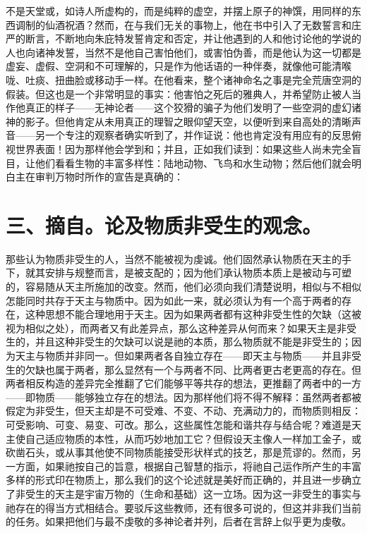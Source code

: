 不是天堂或，如诗人所虚构的，而是纯粹的虚空，并摆上原子的神馔，用同样的东西调制的仙酒祝酒？然而，在与我们无关的事物上，他在书中引入了无数誓言和庄严的断言，不断地向朱庇特发誓肯定和否定，并让他遇到的人和他讨论他的学说的人也向诸神发誓，当然不是他自己害怕他们，或害怕伪善，而是他认为这一切都是虚妄、虚假、空洞和不可理解的，只是作为他话语的一种伴奏，就像他可能清喉咙、吐痰、扭曲脸或移动手一样。在他看来，整个诸神命名之事是完全荒唐空洞的假装。但这也是一个非常明显的事实：他害怕之死后的雅典人，并希望防止被人当作他真正的样子——无神论者——这个狡猾的骗子为他们发明了一些空洞的虚幻诸神的影子。但他肯定从未用真正的理智之眼仰望天空，以便听到来自高处的清晰声音——另一个专注的观察者确实听到了，并作证说：他也肯定没有用应有的反思俯视世界表面！因为那样他会学到和；并且，正如我们读到：如果这些人尚未完全盲目，让他们看看生物的丰富多样性：陆地动物、飞鸟和水生动物；然后他们就会明白主在审判万物时所作的宣告是真确的：\par


\section{三、摘自。论及物质非受生的观念。}

那些认为物质非受生的人，当然不能被视为虔诚。他们固然承认物质在天主的手下，就其安排与规整而言，是被支配的；因为他们承认物质本质上是被动与可塑的，容易随从天主所施加的改变。然而，他们必须向我们清楚说明，相似与不相似怎能同时共存于天主与物质中。因为如此一来，就必须认为有一个高于两者的存在，这种思想不能合理地用于天主。因为如果两者都有这种非受生性的欠缺（这被视为相似之处），而两者又有此差异点，那么这种差异从何而来？如果天主是非受生的，并且这种非受生的欠缺可以说是祂的本质，那么物质就不能是非受生的；因为天主与物质并非同一。但如果两者各自独立存在——即天主与物质——并且非受生的欠缺也属于两者，那么显然有一个与两者不同、比两者更古老更高的存在。但两者相反构造的差异完全推翻了它们能够平等共存的想法，更推翻了两者中的一方——即物质——能够独立存在的想法。因为那样他们将不得不解释：虽然两者都被假定为非受生，但天主却是不可受难、不变、不动、充满动力的，而物质则相反：可受影响、可变、易变、可改。那么，这些属性怎能和谐共存与结合呢？难道是天主使自己适应物质的本性，从而巧妙地加工它？但假设天主像人一样加工金子，或砍凿石头，或从事其他使不同物质能接受形状样式的技艺，那是荒谬的。然而，另一方面，如果祂按自己的旨意，根据自己智慧的指示，将祂自己运作所产生的丰富多样的形式印在物质上，那么我们的这个论述就是美好而正确的，并且进一步确立了非受生的天主是宇宙万物的（生命和基础）这一立场。因为这一非受生的事实与祂存在的得当方式相结合。要驳斥这些教师，还有很多可说的，但这并非我们当前的任务。如果把他们与最不虔敬的多神论者并列，后者在言辞上似乎更为虔敬。\par

